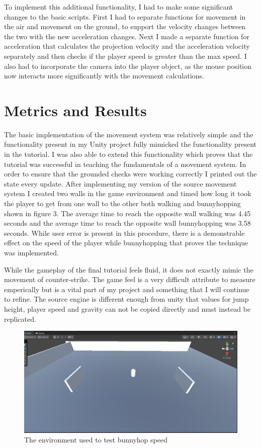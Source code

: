 \documentclass[10pt,twocolumn]{article}
\begin{document}
To implement this additional functionality, I had to make some significant changes to the basic scripts. First I had to separate functions for movement in the air and movement on the ground, to support the velocity changes between the two with the new acceleration changes. Next I made a separate function for acceleration that calculates the projection velocity and the acceleration velocity separately and then checks if the player speed is greater than the max speed. I also had to incorporate the camera into the player object, as the mouse position now interacts more significantly with the movement calculations. 

\section{Metrics and Results}
The basic implementation of the movement system was relatively simple and the functionality present in my Unity project fully mimicked the functionality present in the tutorial. I was also able to extend this functionality which proves that the tutorial was successful in teaching the fundamentals of a movement system. In order to ensure that the grounded checks were working correctly I printed out the state every update. After implementing my version of the source movement system I created two walls in the game environment and timed how long it took the player to get from one wall to the other both walking and bunnyhopping shown in figure 3. The average time to reach the opposite wall walking was 4.45 seconds and the average time to reach the opposite wall bunnyhopping was 3.58 seconds. While user error is present in this procedure, there is a demonstrable effect on the speed of the player while bunnyhopping that proves the technique was implemented. 

While the gameplay of the final tutorial feels fluid, it does not exactly mimic the movement of counter-strike. The game feel is a very difficult attribute to measure emperically but is a vital part of my project and something that I will continue to refine. The source engine is different enough from unity that values for jump height, player speed and gravity can not be copied directly and must instead be replicated.
\begin{figure}
    \centering
    \includegraphics[width=.95\linewidth]{speedTest.png}
    \caption{
        The environment used to test bunnyhop speed
    }
    \label{figure 3}
\end{figure}
\end{document}
